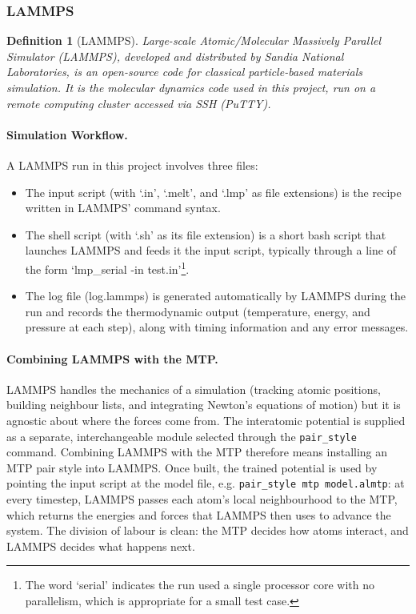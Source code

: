 \documentclass{article}
\newtheorem{definition}{Definition}
\begin{document}
\subsubsection{LAMMPS}
\begin{definition}[LAMMPS]
    Large-scale Atomic/Molecular Massively Parallel Simulator (LAMMPS), developed and distributed by Sandia National Laboratories, is an open-source code for classical particle-based materials simulation. It is the molecular dynamics code used in this project, run on a remote computing cluster accessed via SSH (PuTTY).
\end{definition}

\paragraph{Simulation Workflow.}

A LAMMPS run in this project involves three files:
\begin{itemize}
    \item The input script (with `.in', `.melt', and `.lmp' as file extensions) is the recipe written in LAMMPS' command syntax.
    \item The shell script (with `.sh' as its file extension) is a short bash script that launches LAMMPS and feeds it the input script, typically through a line of the form `lmp\_serial -in test.in'\footnote{The word `serial' indicates the run used a single processor core with no parallelism, which is appropriate for a small test case.}.
    \item The log file (log.lammps) is generated automatically by LAMMPS during the run and records the thermodynamic output (temperature, energy, and pressure at each step), along with timing information and any error messages.
\end{itemize}

\paragraph{Combining LAMMPS with the MTP.}

LAMMPS handles the mechanics of a simulation (tracking atomic positions, building neighbour lists, and integrating Newton's equations of motion) but it is agnostic about where the forces come from. The interatomic potential is supplied as a separate, interchangeable module selected through the \texttt{pair\_style} command. Combining LAMMPS with the MTP therefore means installing an MTP pair style into LAMMPS. Once built, the trained potential is used by pointing the input script at the model file, e.g. \texttt{pair\_style mtp model.almtp}: at every timestep, LAMMPS passes each atom's local neighbourhood to the MTP, which returns the energies and forces that LAMMPS then uses to advance the system. The division of labour is clean: the MTP decides how atoms interact, and LAMMPS decides what happens next.
\end{document}

